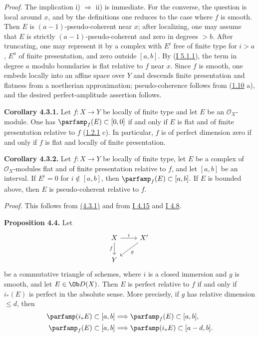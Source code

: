 \emph{Proof.} The implication i) \(\Rightarrow\) ii) is immediate. For the converse, the question is local around \(x\), and by the definitions one reduces to the case where \(f\) is smooth. Then \(E\) is \((a-1)\)-pseudo-coherent near \(x\); after localizing, one may assume that \(E\) is strictly \((a-1)\)-pseudo-coherent and zero in degrees \(>b\). After truncating, one may represent it by a complex with \(E^i\) free of finite type for \(i>a\), \(E^a\) of finite presentation, and zero outside \([a,b]\). By (\hyperlink{sga6.e01.lem.5-1-1}{I 5.1.1}), the term in degree \(a\) modulo boundaries is flat relative to \(f\) near \(x\). Since \(f\) is smooth, one embeds locally into an affine space over \(Y\) and descends finite presentation and flatness from a noetherian approximation; pseudo-coherence follows from (\hyperlink{sga6.e03.cor.1-10}{1.10} a), and the desired perfect-amplitude assertion follows.

\textbf{Corollary 4.3.1.} Let \(f:X\to Y\) be locally of finite type and let \(E\) be an \(\mathcal O_X\)-module. One has \(\parfamp_f(E)\subset[0,0]\) if and only if \(E\) is flat and of finite presentation relative to \(f\) (\hyperlink{sga6.e03.rem.1-2-1}{1.2.1} c). In particular, \(f\) is of perfect dimension zero if and only if \(f\) is flat and locally of finite presentation.

\textbf{Corollary 4.3.2.} Let \(f:X\to Y\) be locally of finite type, let \(E\) be a complex of \(\mathcal O_X\)-modules flat and of finite presentation relative to \(f\), and let \([a,b]\) be an interval. If \(E^i=0\) for \(i\notin[a,b]\), then \(\parfamp_f(E)\subset[a,b]\). If \(E\) is bounded above, then \(E\) is pseudo-coherent relative to \(f\).

\emph{Proof.} This follows from \hyperlink{sga6.e03.cor.4-3-1}{(4.3.1)} and from \hyperlink{sga6.e01.prop.4-15}{I 4.15} and \hyperlink{sga6.e01.ex.4-8}{I 4.8}.

\textbf{Proposition 4.4.} Let
\[
\begin{tikzcd}
X \arrow[r,"i"] \arrow[d,"f"'] & X' \arrow[dl,"g"]\\
Y &
\end{tikzcd}
\]
be a commutative triangle of schemes, where \(i\) is a closed immersion and \(g\) is smooth, and let \(E\in\Ob D(X)\). Then \(E\) is perfect relative to \(f\) if and only if \(i_*(E)\) is perfect in the absolute sense. More precisely, if \(g\) has relative dimension \(\leq d\), then
\begin{align*}
\parfamp(i_*E)
  \subset[a,b]&\Longrightarrow \parfamp_f(E)
  \subset[a,b],\\
\parfamp_f(E)
  \subset[a,b]&\Longrightarrow \parfamp(i_*E)
  \subset[a-d,b].
\end{align*}

